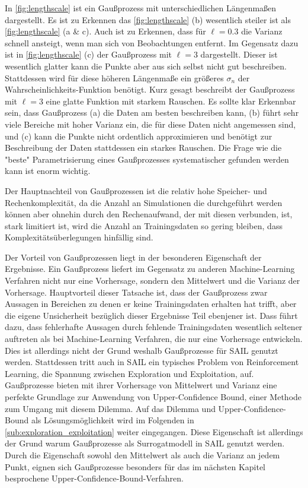 In \cref{fig:lengthscale} ist ein Gaußprozess mit unterschiedlichen Längenmaßen dargestellt.
Es ist zu Erkennen das \cref{fig:lengthscale} (b) wesentlich steiler ist als \cref{fig:lengthscale} (a \& c).
Auch ist zu Erkennen, dass für $\ell=0.3$ die Varianz schnell ansteigt, wenn man sich von Beobachtungen entfernt.
Im Gegensatz dazu ist in \cref{fig:lengthscale} (c) der Gaußprozess mit $\ell = 3$ dargestellt. Dieser ist wesentlich glatter kann die Punkte aber aus sich selbst nicht gut beschreiben. 
Stattdessen wird für diese höheren Längenmaße ein größeres $\sigma_n$ der Wahrscheinlichkeits-Funktion benötigt. 
Kurz gesagt beschreibt der Gaußprozess mit $\ell=3$ eine glatte Funktion mit starkem Rauschen.
Es sollte klar Erkennbar sein, dass Gaußprozess (a) die Daten am besten beschreiben kann, (b) führt sehr viele Bereiche mit hoher Varianz ein, die für diese Daten nicht angemessen sind, und (c) kann die Punkte nicht ordentlich approximieren und benötigt zur Beschreibung der Daten stattdessen ein starkes Rauschen.
Die Frage wie die "beste" Parametrisierung eines Gaußprozesses systematischer gefunden werden kann ist enorm wichtig.


Der Hauptnachteil von Gaußprozessen ist die relativ hohe Speicher- und Rechenkomplexität, da die Anzahl an Simulationen die durchgeführt werden können aber ohnehin durch den Rechenaufwand, der mit diesen verbunden, ist, stark limitiert ist, wird die Anzahl an Trainingsdaten so gering bleiben, dass Komplexitätsüberlegungen hinfällig sind.

Der Vorteil von Gaußprozessen liegt in der besonderen Eigenschaft der Ergebnisse.
Ein Gaußprozess liefert im Gegensatz zu anderen Machine-Learning Verfahren nicht nur eine Vorhersage, sondern den Mittelwert und die Varianz der Vorhersage.
Hauptvorteil dieser Tatsache ist, dass der Gaußprozess zwar Aussagen in Bereichen zu denen er keine Trainingsdaten erhalten hat trifft, aber die eigene Unsicherheit bezüglich dieser Ergebnisse Teil ebenjener ist.
Dass führt dazu, dass fehlerhafte Aussagen durch fehlende Trainingsdaten wesentlich seltener auftreten als bei Machine-Learning Verfahren, die nur eine Vorhersage entwickeln.
Dies ist allerdings nicht der Grund weshalb Gaußprozesse für SAIL genutzt werden.
Stattdessen tritt auch in SAIL ein typisches Problem von Reinforcement Learning, die Spannung zwischen Exploration und Exploitation, auf.
Gaußprozesse bieten mit ihrer Vorhersage von Mittelwert und Varianz eine perfekte Grundlage zur Anwendung von Upper-Confidence Bound, einer Methode zum Umgang mit diesem Dilemma.
Auf das Dilemma und Upper-Confidence-Bound als Lösungsmöglichkeit wird im Folgenden in \cref{sub:exploration_exploitation} weiter eingegangen.
Diese Eigenschaft ist allerdings der Grund warum Gaußprozesse als Surrogatmodell in SAIL genutzt werden.
Durch die Eigenschaft sowohl den Mittelwert als auch die Varianz an jedem Punkt, eignen sich Gaußprozesse besonders für das im nächsten Kapitel besprochene Upper-Confidence-Bound-Verfahren.

